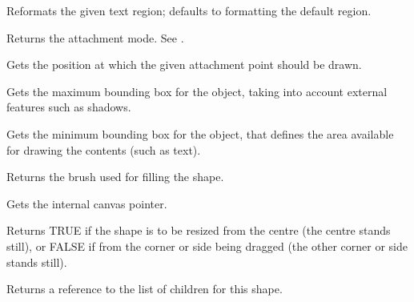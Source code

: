 Reformats the given text region; defaults to formatting the default region.



Returns the attachment mode. See .



Gets the position at which the given attachment point should be drawn.



Gets the maximum bounding box for the object, taking into
account external features such as shadows.



Gets the minimum bounding box for the object, that defines
the area available for drawing the contents (such as text).



Returns the brush used for filling the shape.



Gets the internal canvas pointer.



Returns TRUE if the shape is to be resized from the centre (the centre
stands still), or FALSE if from the corner or side being dragged (the
other corner or side stands still).



Returns a reference to the list of children for this shape.

